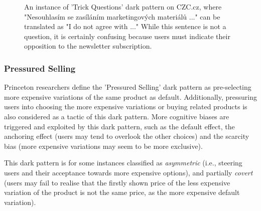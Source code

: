             \begin{figure}[ht]
                \centering
                \caption{An instance of 'Trick Questions' dark pattern on CZC.cz, where "Nesouhlasím se zasíláním marketingových materiálů ..." can be translated as "I do not agree with ..." While this sentence is not a question, it is certainly confusing because users must indicate their opposition to the newsletter subscription.}
                \label{fig:trick-questions-czc}
            \end{figure}
    
            \subsubsection{Pressured Selling}
            Princeton researchers define the 'Pressured Selling' dark pattern as pre-selecting more expensive variations of the same product as default. Additionally, pressuring users into choosing the more expensive variations or buying related products is also considered as a tactic of this dark pattern. More cognitive biases are triggered and exploited by this dark pattern, such as the default effect, the anchoring effect (users may tend to overlook the other choices) and the scarcity bias (more expensive variations may seem to be more exclusive).  
            
            This dark pattern is for some instances classified as \emph{asymmetric} (i.e., steering users and their acceptance towards more expensive options), and partially \emph{covert} (users may fail to realise that the firstly shown price of the less expensive variation of the product is not the same price, as the more expensive default variation).
    
